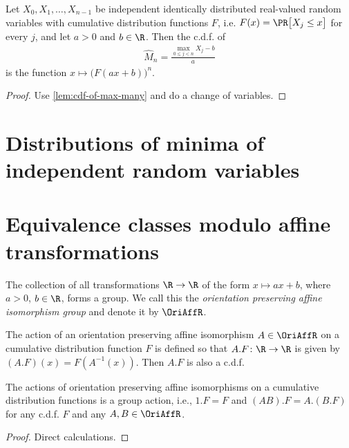\begin{lemma}
  \label{lem:cdf-of-affine-max-many}
  Let $X_0, X_1, \ldots, X_{n-1}$ be independent identically distributed real-valued random variables
  with cumulative distribution functions $F$,
  i.e. $F(x) = \PR \big[ X_j \le x \big]$ for every $j$,
  and let $a > 0$ and $b \in \R$.
  Then the c.d.f. of
  \begin{align*}
  \hat{M}_n = \frac{\max_{0 \le j < n} X_j - b}{a}
  \end{align*}
  is the function $x \mapsto \big(F(a x + b)\big)^n$.
\end{lemma}
\begin{proof}
  Use \ref{lem:cdf-of-max-many} and do a change of variables.
\end{proof}

\section{Distributions of minima of independent random variables}

\section{Equivalence classes modulo affine transformations}

\begin{definition}
  \label{def:oriented-affine-isomorphism}
  \leanok
  The collection of all transformations $\R \to \R$ of the form
  $x \mapsto a x + b$, where $a>0$, $b \in \R$, forms a group.
  We call this the \emph{orientation preserving affine isomorphism group}
  and denote it by $\OriAffR$.
\end{definition}

\begin{definition}
  \label{def:oriented-affine-transform-of-cdf}
  \leanok
  The action of an orientation preserving affine isomorphism $A \in \OriAffR$
  on a cumulative distribution function $F$ is defined so
  that $A.F \colon \R \to \R$ is given by $(A.F)(x) = F(A^{-1}(x))$.
  Then $A.F$ is also a c.d.f.
\end{definition}

\begin{lemma}
  \label{lem:oriented-affine-action-on-cdf}
  \leanok
  The actions of orientation preserving affine isomorphisms
  on a cumulative distribution functions is a group action, i.e.,
  $1.F = F$ and $(AB).F = A.(B.F)$ for any c.d.f. $F$ and any $A,B \in \OriAffR$.
\end{lemma}
\begin{proof}
  \uses{}
  Direct calculations.
\end{proof}

